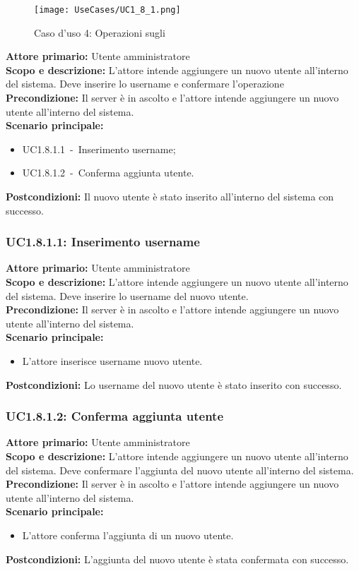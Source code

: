 \documentclass{scalatekids-article}
\begin{document}
\begin{figure}[H]
  \begin{center}
    \texttt{[image: UseCases/UC1\_8\_1.png]}
    \caption{Caso d'uso 4: Operazioni sugli }
  \end{center}
\end{figure}
\textbf{Attore primario:} Utente amministratore\\
\textbf{Scopo e descrizione:} L'attore intende aggiungere un nuovo utente all'interno del sistema. Deve inserire lo username e confermare l'operazione\\
\textbf{Precondizione:} Il server è in ascolto e l'attore intende aggiungere un nuovo utente all'interno del sistema.\\
\textbf{Scenario principale:}
\begin{itemize}
\item UC1.8.1.1\ -\ Inserimento username;
\item UC1.8.1.2\ -\ Conferma aggiunta utente.
\end{itemize}
\textbf{Postcondizioni:} Il nuovo utente è stato inserito all'interno del sistema con successo.

\subsubsection{UC1.8.1.1: Inserimento username}

\textbf{Attore primario:} Utente amministratore\\
\textbf{Scopo e descrizione:} L'attore intende aggiungere un nuovo utente all'interno del sistema. Deve inserire lo username del nuovo utente.\\
\textbf{Precondizione:} Il server è in ascolto e l'attore intende aggiungere un nuovo utente all'interno del sistema.\\
\textbf{Scenario principale:}
\begin{itemize}
\item L'attore inserisce username nuovo utente.
\end{itemize}
\textbf{Postcondizioni:} Lo username del nuovo utente è stato inserito con successo.

\subsubsection{UC1.8.1.2: Conferma aggiunta utente}

\textbf{Attore primario:} Utente amministratore\\
\textbf{Scopo e descrizione:} L'attore intende aggiungere un nuovo utente all'interno del sistema. Deve confermare l'aggiunta del nuovo utente all'interno del sistema.\\
\textbf{Precondizione:} Il server è in ascolto e l'attore intende aggiungere un nuovo utente all'interno del sistema.\\
\textbf{Scenario principale:}
\begin{itemize}
\item L'attore conferma l'aggiunta di un nuovo utente.
\end{itemize}
\textbf{Postcondizioni:} L'aggiunta del nuovo utente è stata confermata con successo.
\end{document}
